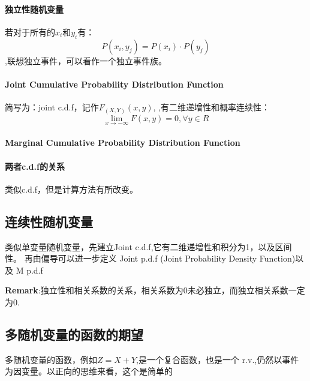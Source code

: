 \documentclass[12pt,a4paper]{ctexart}
\begin{document}
\paragraph{独立性随机变量}
若对于所有的$ x_i $和$ y_i $有：
\[ P \left(x_i,y_j\right) =P \left(x_i\right) \cdot P \left(y_j\right)\]
,联想独立事件，可以看作一个独立事件族。

\paragraph{Joint Cumulative Probability Distribution Function}
简写为：joint c.d.f，记作$ F_{\left(X,Y\right)} \left(x,y\right)$,
,有二维递增性和概率连续性：\[ \lim\limits_{x \rightarrow-\infty} F \left(x,y\right)=0 ,\forall y \in R\]

\paragraph{Marginal Cumulative Probability Distribution Function}

\paragraph{两者c.d.f的关系}
类似c.d.f，但是计算方法有所改变。

\subsection{连续性随机变量}
类似单变量随机变量，先建立Joint c.d.f,它有二维递增性和积分为1，以及区间
性。
再由偏导可以进一步定义 Joint p.d.f (Joint Probability Density Function)以及 M p.d.f

\textbf{Remark}:独立性和相关系数的关系，相关系数为0未必独立，而独立相关系数一定为0.

\subsection{多随机变量的函数的期望}
多随机变量的函数，例如$ Z =X+Y $,是一个复合函数，也是一个 r.v.,仍然以事件为因变量。以正向的思维来看，这个是简单的
\end{document}
